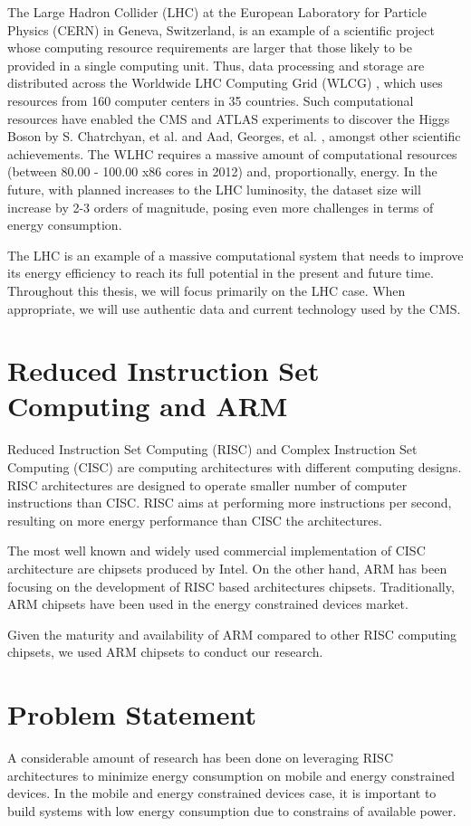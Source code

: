 The Large Hadron Collider (LHC) \cite{LHC} at the European Laboratory for Particle
Physics (CERN) in Geneva, Switzerland, is an example of a scientific project
whose computing resource requirements are larger that those likely to be provided 
in a single computing unit. Thus, data processing and storage are distributed across 
the Worldwide LHC
Computing Grid (WLCG) \cite{WLCG}, which uses resources from 160 computer centers in 35
countries. Such computational resources have enabled the CMS \cite{CMS} and ATLAS \cite{ATLAS}
experiments to discover the Higgs Boson by S. Chatrchyan, et al. \cite{HIGGS2} and Aad, Georges, et al. \cite{HIGGS1}, amongst other scientific 
achievements. 
The WLHC requires a massive amount of computational resources 
(between 80.00 - 100.00 x86 cores in 2012) and,
proportionally, energy. In the future, with planned increases to the LHC
luminosity, the dataset size will increase by 2-3 orders of magnitude,
posing even more challenges in terms of energy consumption.

The LHC is an example of a massive computational system that needs to improve its
energy efficiency to reach its full potential in the present and future time.
Throughout this thesis, we will focus primarily on the LHC case. When
appropriate, we will use authentic data and current technology used by the CMS.  

\section{Reduced Instruction Set Computing and ARM}
Reduced Instruction Set Computing (RISC) and Complex Instruction Set Computing (CISC) are computing architectures with different computing designs. RISC architectures are designed to operate smaller number of computer instructions than CISC. RISC aims at performing more instructions per second, resulting on more energy performance than CISC the architectures.

The most well known and widely used commercial implementation of CISC architecture are chipsets produced by Intel. On the other hand, ARM has been focusing on the development of RISC based architectures chipsets. Traditionally, ARM chipsets have been used in the energy constrained devices market.

Given the maturity and availability of ARM compared to other RISC computing chipsets, we used ARM chipsets to conduct our research.

\section{Problem Statement}
A considerable amount of research has been done on leveraging RISC architectures to minimize energy consumption on 
mobile and energy constrained devices. In the mobile and energy constrained devices case, it is important to build systems with low energy consumption due to constrains of available power.

